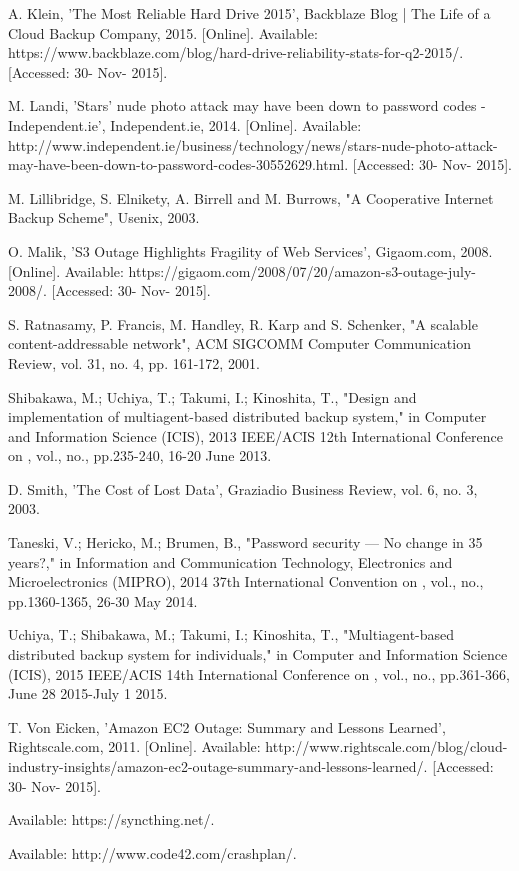 \documentclass{scu-thesis}
\begin{document}
\begin{thebibliography}{9}
A.  Klein, 'The Most Reliable Hard Drive 2015', Backblaze Blog | The Life of a Cloud Backup Company, 2015. [Online]. Available: https://www.backblaze.com/blog/hard-drive-reliability-stats-for-q2-2015/. [Accessed: 30- Nov- 2015].

M.  Landi, 'Stars' nude photo attack may have been down to password codes - Independent.ie', Independent.ie, 2014. [Online]. Available: http://www.independent.ie/business/technology/news/stars-nude-photo-attack-may-have-been-down-to-password-codes-30552629.html. [Accessed: 30- Nov- 2015].

M.  Lillibridge, S.  Elnikety, A.  Birrell and M.  Burrows, "A Cooperative Internet Backup Scheme", Usenix, 2003.

O.  Malik, 'S3 Outage Highlights Fragility of Web Services', Gigaom.com, 2008. [Online]. Available: https://gigaom.com/2008/07/20/amazon-s3-outage-july-2008/. [Accessed: 30- Nov- 2015].

S.  Ratnasamy, P.  Francis, M.  Handley, R.  Karp and S.  Schenker, "A scalable content-addressable network", ACM SIGCOMM Computer Communication Review, vol. 31, no. 4, pp. 161-172, 2001.

Shibakawa, M.; Uchiya, T.; Takumi, I.; Kinoshita, T., "Design and implementation of multiagent-based distributed backup system," in Computer and Information Science (ICIS), 2013 IEEE/ACIS 12th International Conference on , vol., no., pp.235-240, 16-20 June 2013.


D.  Smith, 'The Cost of Lost Data', Graziadio Business Review, vol. 6, no. 3, 2003.

Taneski, V.; Hericko, M.; Brumen, B., "Password security — No change in 35 years?," in Information and Communication Technology, Electronics and Microelectronics (MIPRO), 2014 37th International Convention on , vol., no., pp.1360-1365, 26-30 May 2014.

Uchiya, T.; Shibakawa, M.; Takumi, I.; Kinoshita, T., "Multiagent-based distributed backup system for individuals," in Computer and Information Science (ICIS), 2015 IEEE/ACIS 14th International Conference on , vol., no., pp.361-366, June 28 2015-July 1 2015.

T.  Von Eicken, 'Amazon EC2 Outage: Summary and Lessons Learned', Rightscale.com, 2011. [Online]. Available: http://www.rightscale.com/blog/cloud-industry-insights/amazon-ec2-outage-summary-and-lessons-learned/. [Accessed: 30- Nov- 2015].

Available: https://syncthing.net/.

Available: http://www.code42.com/crashplan/.

\end{thebibliography}

\backmatter
\end{document}
